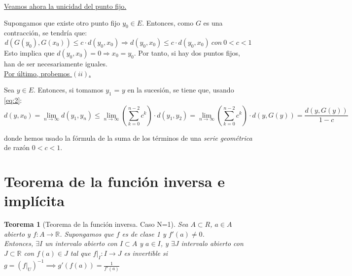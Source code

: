 \documentclass[11pt, a4paper, titlepage]{article}
\makeatletter
\renewenvironment{proof}[1][\proofname] {\vspace{-15pt}\par\pushQED{\qed}\normalfont\topsep6\p@\@plus6\p@\relax\trivlist\item[\hskip\labelsep\it#1\@addpunct{.}]\ignorespaces}{\popQED\endtrivlist\@endpefalse}
\newcommand{\R}{\mathbb{R}}
\theoremstyle{theorem-style}
\newtheorem*{nth}{Teorema}
\theoremstyle{definition-style}
\theoremstyle{remark-style}
\theoremstyle{example-style}
\makeatother
\begin{document}
\begin{proof}
\underline{Veamos ahora la unicidad del punto fijo.}

\vspace{0.5em}
Supongamos que existe otro punto fijo $y_0 \in E$. Entonces, como $G$ es una contracción, se tendría que: 
$$d(G(y_0),G(x_{0})) \le c\cdot d(y_0, x_0) \Rightarrow d(y_0, x_0) \le c \cdot d(y_0, x_0)\ con\ 0 < c < 1$$ Esto implica que $d(y_0,x_0) = 0 \Rightarrow x_0 = y_0$. Por tanto, si hay dos puntos fijos, han de ser necesariamente iguales.\\

\underline{Por último, probemos $(ii)$.}

Sea $y \in E$. Entonces, si tomamos $y_1$ = $y$ en la sucesión, se tiene que, usando \eqref{eq:2}: $$d(y,x_0) = \lim_{n\rightarrow \infty}d(y_1,y_n) \le \lim_{n\rightarrow \infty}\left(\sum_{k=0}^{n-2} c^k\right)\cdot d(y_1, y_2)= \lim_{n\rightarrow \infty}\left(\sum_{k=0}^{n-2} c^k\right)\cdot d(y, G(y)) = \frac{d(y, G(y))}{1-c} $$

donde hemos usado la fórmula de la suma de los términos de una \textit{serie geométrica} de razón $0 < c < 1$.
\end{proof}

\section{Teorema de la función inversa e implícita}
\begin{nth}[Teorema de la función inversa. Caso N=1]
	Sea $A\subset R$, $a \in A$ abierto y $f:A \to \R$. Supongamos que $f$ es de clase 1 y $f'(a) \ne 0$.\\
	 Entonces, $\exists I $ un intervalo abierto con $I \subset A$ y $a \in I$, y $\exists J$ intervalo abierto con $J\subset \R$ con $f(a) \in J$ tal que $f|_I: I \to J$ es invertible si $g = (f|_U)^{-1} \implies g'(f(a)) = \frac{1}{f'(a)}$
\end{nth}
\end{document}
